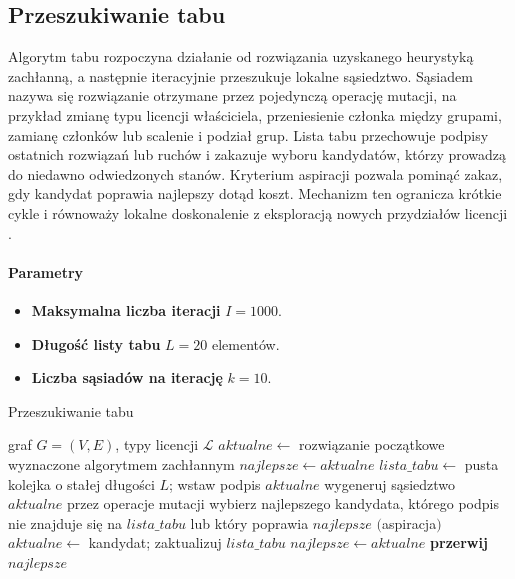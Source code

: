 \subsection{Przeszukiwanie tabu}\label{subsec:tabu}
Algorytm tabu rozpoczyna działanie od rozwiązania uzyskanego heurystyką zachłanną, a następnie iteracyjnie przeszukuje lokalne sąsiedztwo. Sąsiadem nazywa się rozwiązanie otrzymane przez pojedynczą operację mutacji, na przykład zmianę typu licencji właściciela, przeniesienie członka między grupami, zamianę członków lub scalenie i podział grup. Lista tabu przechowuje podpisy ostatnich rozwiązań lub ruchów i zakazuje wyboru kandydatów, którzy prowadzą do niedawno odwiedzonych stanów. Kryterium aspiracji pozwala pominąć zakaz, gdy kandydat poprawia najlepszy dotąd koszt. Mechanizm ten ogranicza krótkie cykle i równoważy lokalne doskonalenie z eksploracją nowych przydziałów licencji \cite{glover1989}.

\paragraph{Parametry}
\begin{itemize}
  \item \textbf{Maksymalna liczba iteracji} \(I=1000\).
  \item \textbf{Długość listy tabu} \(L=20\) elementów.
  \item \textbf{Liczba sąsiadów na iterację} \(k=10\).
\end{itemize}

\begin{algorithm}[H]
  \caption{Przeszukiwanie tabu}\label{alg:tabu}
  \begin{algorithmic}[1]
    \Require graf \(G=(V,E)\), typy licencji \(\mathcal{L}\)
    \State \(aktualne \gets\) rozwiązanie początkowe wyznaczone algorytmem zachłannym
    \State \(najlepsze \gets aktualne\)
    \State \(lista\_tabu \gets\) pusta kolejka o stałej długości \(L\); wstaw podpis \(aktualne\)
    \State wygeneruj sąsiedztwo \(aktualne\) przez operacje mutacji
    \State wybierz najlepszego kandydata, którego podpis nie znajduje się na \(lista\_tabu\) lub który poprawia \(najlepsze\) \((\)aspiracja\()\)
    \State \(aktualne \gets\) kandydat; zaktualizuj \(lista\_tabu\)
     \State \(najlepsze \gets aktualne\) \EndIf
    \Else
    \State \textbf{przerwij}
    \EndIf
    \EndFor
    \State \Return \(najlepsze\)
  \end{algorithmic}
\end{algorithm}

